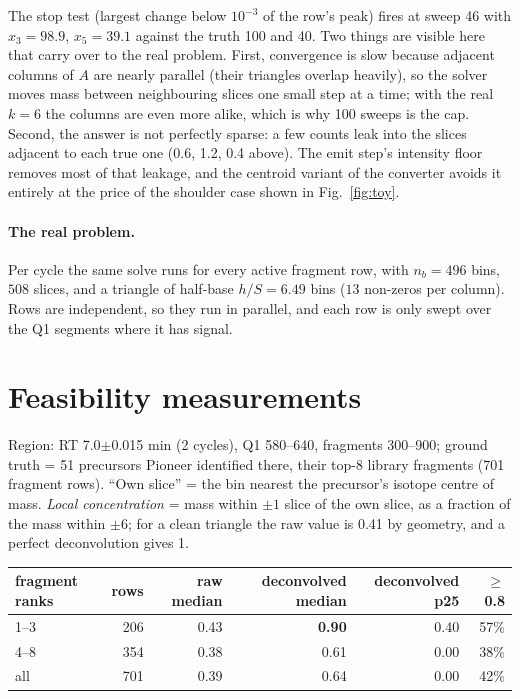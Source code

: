 \documentclass[11pt]{article}
\begin{document}
The stop test (largest change below $10^{-3}$ of the row's peak) fires at sweep 46 with $x_3=98.9$, $x_5=39.1$ against the truth 100 and 40. Two things are visible here that carry over to the real problem. First, convergence is slow because adjacent columns of $A$ are nearly parallel (their triangles overlap heavily), so the solver moves mass between neighbouring slices one small step at a time; with the real $k=6$ the columns are even more alike, which is why 100 sweeps is the cap. Second, the answer is not perfectly sparse: a few counts leak into the slices adjacent to each true one (0.6, 1.2, 0.4 above). The emit step's intensity floor removes most of that leakage, and the centroid variant of the converter avoids it entirely at the price of the shoulder case shown in Fig.~\ref{fig:toy}.

\paragraph{The real problem.} Per cycle the same solve runs for every active fragment row, with $n_b=496$ bins, $508$ slices, and a triangle of half-base $h/S=6.49$ bins ($13$ non-zeros per column). Rows are independent, so they run in parallel, and each row is only swept over the Q1 segments where it has signal.

\section{Feasibility measurements}
Region: RT 7.0$\pm$0.015 min (2 cycles), Q1 580--640, fragments 300--900; ground truth = 51 precursors Pioneer identified there, their top-8 library fragments (701 fragment rows). ``Own slice'' = the bin nearest the precursor's isotope centre of mass. \emph{Local concentration} = mass within $\pm1$ slice of the own slice, as a fraction of the mass within $\pm6$; for a clean triangle the raw value is 0.41 by geometry, and a perfect deconvolution gives 1.

\begin{center}\begin{tabular}{lrrrrr}\toprule
fragment ranks & rows & raw median & deconvolved median & deconvolved p25 & $\ge$0.8 \\ \midrule
1--3 & 206 & 0.43 & \textbf{0.90} & 0.40 & 57\% \\
4--8 & 354 & 0.38 & 0.61 & 0.00 & 38\% \\
all  & 701 & 0.39 & 0.64 & 0.00 & 42\% \\ \bottomrule
\end{tabular}\end{center}
\end{document}
